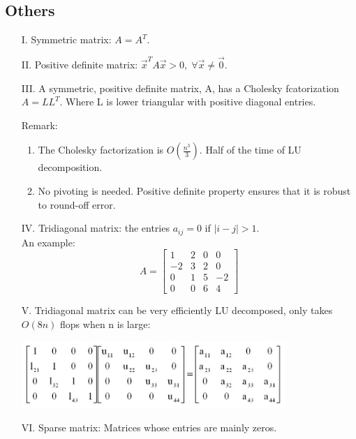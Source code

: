 	\subsection{Others}
	\begin{enumerate}
		\item [I.] Symmetric matrix: $A = A^T$.
		\item [II.] Positive definite matrix: $\vec{x}^T A \vec{x} > 0, \; \forall \vec{x} \neq \vec{0}$.
		\item [III.] A symmetric, positive definite matrix, A, has a Cholesky fcatorization $A = LL^T$. Where L is lower triangular with positive diagonal entries.
	
	
	Remark:
	\begin{enumerate}
		\item The Cholesky factorization is $O(\frac{n^3}{3})$. Half of the time of LU decomposition.\\
		\item No pivoting is needed. Positive definite property ensures that it is robust to round-off error.
	\end{enumerate} 
	
	\item [IV.] Tridiagonal matrix: the entries $a_{ij} = 0$ if $|i-j|>1$.\\
	An example: 
	\[ A = \begin{bmatrix} 
	1 & 2 & 0 & 0\\  
	-2 & 3 & 2 & 0 \\
	0 & 1 & 5 & -2\\
	0 & 0 & 6 & 4 
	\end{bmatrix} \] 
	\item [V.] Tridiagonal matrix can be very efficiently LU decomposed, only takes $O(8n)$ flops when n is large:
	
	\includegraphics[width=10cm]{img/tridiagonal_matrix}\\
	\item [VI.] Sparse matrix: Matrices whose entries are mainly zeros.
	
	 
	\end{enumerate}
	
	